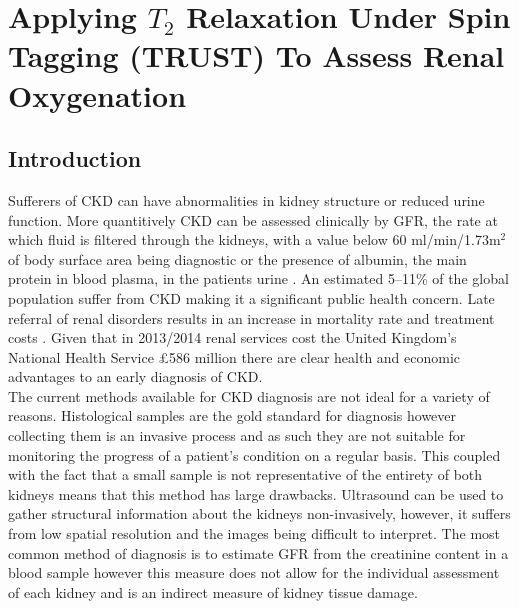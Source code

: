 \chapter{Applying $T_2$ Relaxation Under Spin Tagging (TRUST) To Assess Renal Oxygenation}
\label{chap:TRUST}

\section{Introduction}
Sufferers of \ac{CKD} can have abnormalities in kidney structure or reduced urine function. More quantitively \ac{CKD} can be assessed clinically by \ac{GFR}, the rate at which fluid is filtered through the kidneys, with a value below 60 ml/min/1.73m$^2$ of body surface area being diagnostic or the presence of albumin, the main protein in blood plasma, in the patients urine \cite{stevens_assessing_2006, farrugia_albumin_2010, pruijm_blood_2017}.  An estimated 5–11\% of the global population suffer from \ac{CKD} \cite{
	coresh_prevalence_2003, de_lusignan_identifying_2005, drey_population-based_2003, amato_prevalence_2005, chadban_prevalence_2003} making it a significant public health concern. Late referral of renal disorders results in an increase in mortality rate and treatment costs \cite{jungers_late_1993, sesso_late_1996, klebe_cost_2007}. Given that in 2013/2014 renal services cost the United Kingdom's National Health Service \pounds 586 million \cite{precious_nhs_2015} there are clear health and economic advantages to an early diagnosis of \ac{CKD}.\\

The current methods available for \ac{CKD} diagnosis are not ideal for a variety of reasons. Histological samples are the gold standard for diagnosis however collecting them is an invasive process and as such they are not suitable for monitoring the progress of a patient's condition on a regular basis. This coupled with the fact that a small sample is not representative of the entirety of both kidneys means that this method  has large drawbacks. Ultrasound can be used to gather structural information about the kidneys non-invasively, however, it suffers from low spatial resolution and the images being difficult to interpret. The most common method of diagnosis is to estimate \ac{GFR} from the creatinine content in a blood sample however this measure does not allow for the individual assessment of each kidney and is an indirect measure of kidney tissue damage.\\

